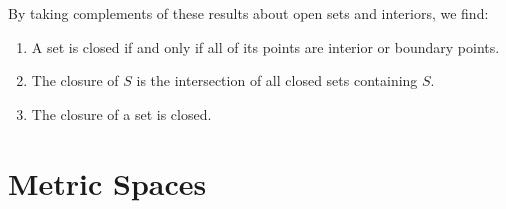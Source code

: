 \documentclass[11pt]{article}
\begin{document}
By taking complements of these results about open sets and interiors, we find:
\begin{enumerate}
  \item A set is closed if and only if all of its points are interior or boundary points.
  \item The closure of $S$ is the intersection of all closed sets containing $S$.
  \item The closure of a set is closed.
\end{enumerate}


\section{Metric Spaces}


\end{document}
